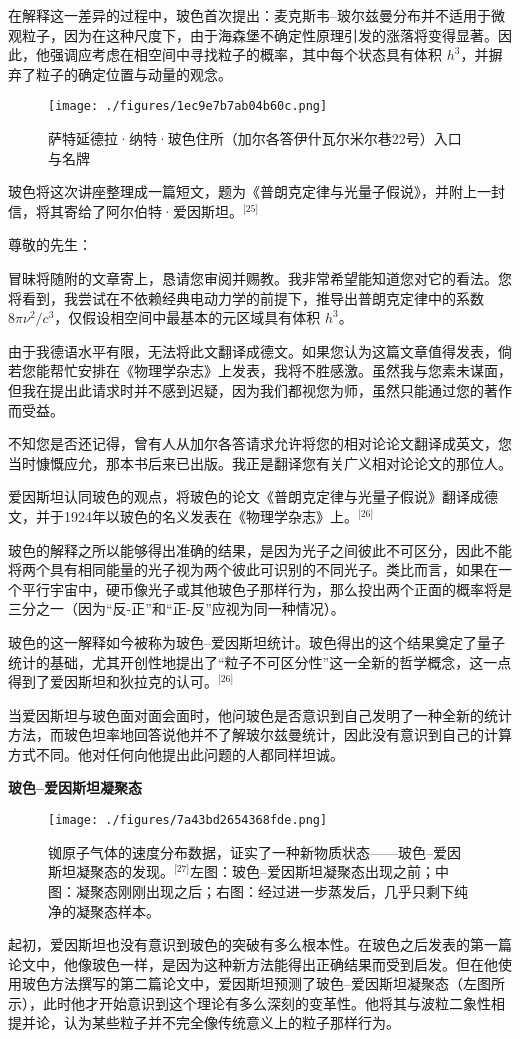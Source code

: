 在解释这一差异的过程中，玻色首次提出：麦克斯韦–玻尔兹曼分布并不适用于微观粒子，因为在这种尺度下，由于海森堡不确定性原理引发的涨落将变得显著。因此，他强调应考虑在相空间中寻找粒子的概率，其中每个状态具有体积 $h^3$，并摒弃了粒子的确定位置与动量的观念。
\begin{figure}[ht]
\centering
\texttt{[image: ./figures/1ec9e7b7ab04b60c.png]}
\caption{萨特延德拉·纳特·玻色住所（加尔各答伊什瓦尔米尔巷22号）入口与名牌} \label{fig_BOSE_2}
\end{figure}
玻色将这次讲座整理成一篇短文，题为《普朗克定律与光量子假说》，并附上一封信，将其寄给了阿尔伯特·爱因斯坦。\(^\text{[25]}\)

尊敬的先生：

冒昧将随附的文章寄上，恳请您审阅并赐教。我非常希望能知道您对它的看法。您将看到，我尝试在不依赖经典电动力学的前提下，推导出普朗克定律中的系数 $8\pi \nu^2/c^3$，仅假设相空间中最基本的元区域具有体积 $h^3$。

由于我德语水平有限，无法将此文翻译成德文。如果您认为这篇文章值得发表，倘若您能帮忙安排在《物理学杂志》上发表，我将不胜感激。虽然我与您素未谋面，但我在提出此请求时并不感到迟疑，因为我们都视您为师，虽然只能通过您的著作而受益。

不知您是否还记得，曾有人从加尔各答请求允许将您的相对论论文翻译成英文，您当时慷慨应允，那本书后来已出版。我正是翻译您有关广义相对论论文的那位人。

爱因斯坦认同玻色的观点，将玻色的论文《普朗克定律与光量子假说》翻译成德文，并于1924年以玻色的名义发表在《物理学杂志》上。\(^\text{[26]}\)

玻色的解释之所以能够得出准确的结果，是因为光子之间彼此不可区分，因此不能将两个具有相同能量的光子视为两个彼此可识别的不同光子。类比而言，如果在一个平行宇宙中，硬币像光子或其他玻色子那样行为，那么投出两个正面的概率将是三分之一（因为“反-正”和“正-反”应视为同一种情况）。

玻色的这一解释如今被称为玻色–爱因斯坦统计。玻色得出的这个结果奠定了量子统计的基础，尤其开创性地提出了“粒子不可区分性”这一全新的哲学概念，这一点得到了爱因斯坦和狄拉克的认可。\(^\text{[26]}\)

当爱因斯坦与玻色面对面会面时，他问玻色是否意识到自己发明了一种全新的统计方法，而玻色坦率地回答说他并不了解玻尔兹曼统计，因此没有意识到自己的计算方式不同。他对任何向他提出此问题的人都同样坦诚。

\textbf{玻色–爱因斯坦凝聚态}

\begin{figure}[ht]
\centering
\texttt{[image: ./figures/7a43bd2654368fde.png]}
\caption{铷原子气体的速度分布数据，证实了一种新物质状态——玻色–爱因斯坦凝聚态的发现。\(^\text{[27]}\)左图：玻色–爱因斯坦凝聚态出现之前；中图：凝聚态刚刚出现之后；右图：经过进一步蒸发后，几乎只剩下纯净的凝聚态样本。} \label{fig_BOSE_3}
\end{figure}
起初，爱因斯坦也没有意识到玻色的突破有多么根本性。在玻色之后发表的第一篇论文中，他像玻色一样，是因为这种新方法能得出正确结果而受到启发。但在他使用玻色方法撰写的第二篇论文中，爱因斯坦预测了玻色–爱因斯坦凝聚态（左图所示），此时他才开始意识到这个理论有多么深刻的变革性。他将其与波粒二象性相提并论，认为某些粒子并不完全像传统意义上的粒子那样行为。

